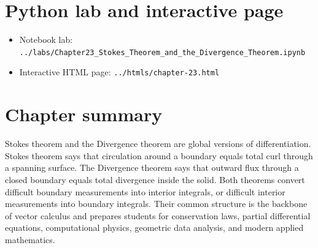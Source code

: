 \documentclass[11pt]{article}
\begin{document}
\section{Python lab and interactive page}

\begin{itemize}
  \item Notebook lab: \texttt{../labs/Chapter23\_Stokes\_Theorem\_and\_the\_Divergence\_Theorem.ipynb}
  \item Interactive HTML page: \texttt{../htmls/chapter-23.html}
\end{itemize}

\section{Chapter summary}

Stokes theorem and the Divergence theorem are global versions of differentiation. Stokes theorem says that circulation around a boundary equals total curl through a spanning surface. The Divergence theorem says that outward flux through a closed boundary equals total divergence inside the solid. Both theorems convert difficult boundary measurements into interior integrals, or difficult interior measurements into boundary integrals. Their common structure is the backbone of vector calculus and prepares students for conservation laws, partial differential equations, computational physics, geometric data analysis, and modern applied mathematics.
\end{document}
